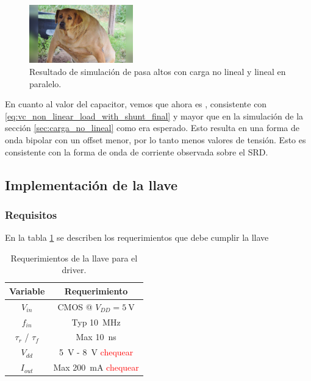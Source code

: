 \begin{figure}[tbp]
    \centering
    \includegraphics[width=0.4\textwidth]{images/placeholder.jpg}
    \caption{Resultado de simulación de pasa altos con carga no lineal y lineal
    en paralelo.}
    \label{fig:highpass_non_linear_w_shunt_simulation_result}
\end{figure}

En cuanto al valor del capacitor, vemos que ahora es , consistente con
\ref{eq:vc_non_linear_load_with_shunt_final} y mayor que en la simulación de la
sección \ref{sec:carga_no_lineal} como era esperado. Esto resulta en una forma
de onda bipolar con un offset menor, por lo tanto menos valores de tensión. Esto
es consistente con la forma de onda de corriente observada sobre el SRD.

\subsection{Implementación de la llave}

\subsubsection{Requisitos}

En la tabla \ref{tab:llave_requirements} se describen los requerimientos que
debe cumplir la llave

\begin{table}
\centering
\begin{tabular}{c|c}
\hline
    Variable & Requerimiento \\
\hline
    $V_{in}$                &   CMOS @ $V_{DD}=\qty{5}{\volt}$    \\
    $f_{in}$                &   Typ \qty{10}{\mega\hertz} \\
    $\tau_{r}$ / $\tau_{f}$ &   Max \qty{10}{\nano\second} \\
    $V_{dd}$                &   \qty{5}{\volt} - \qty{8}{\volt} \textcolor{red}{chequear} \\
    $I_{out}$               &   Max \qty{200}{\milli\ampere} \textcolor{red}{chequear}  \\
\hline
\end{tabular}
\caption{Requerimientos de la llave para el driver.}
\label{tab:llave_requirements}
\end{table}

